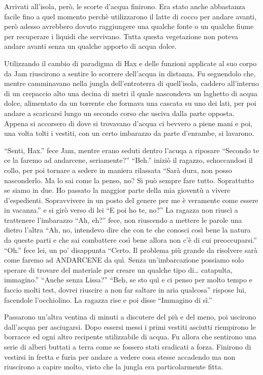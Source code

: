     Arrivati all'isola, però, le scorte d'acqua finirono. Era stato anche
    abbastanza facile fino a quel momento perchè utilizzarono il latte di
    cocco per andare avanti, però adesso avrebbero dovuto raggiungere una
    qualche fonte o un qualche fiume per recuperare i liquidi che
    servivano. Tutta questa vegetazione non poteva andare avanti senza un
    qualche apporto di acqua dolce.
    
    Utilizzando il cambio di paradigma di Hax e delle funzioni applicate al
    suo corpo da Jam riuscirono a sentire lo scorrere dell'acqua in
    distanza. Fu seguendolo che, mentre camminavano nella jungla
    dell'entroterra di quell'isola, caddero all'interno di un crepaccio
    alto una decina di metri il quale nascondeva un laghetto di acqua
    dolce, alimentato da un torrente che formava una cascata su uno dei
    lati, per poi andare a scaricarsi lungo un secondo corso che usciva
    dalla parte opposta. Appena si accorsero di dove si trovavano
    d'acqua ci bevvero a piene mani e poi, una volta tolti i vestiti, con
    un certo imbarazzo da parte d'enrambe, si lavarono.

    ``Senti, Hax.'' fece Jam, mentre erano seduti dentro l'acuqa a
    riposare ``Secondo te ce la faremo ad andarcene, seriamente?'' ``Beh.''
    iniziò il ragazzo, schoccandosi il collo, per poi tornare a sedere in
    maniera rilassata ``Sarà dura, non posso nasconderlo. Ma lo sai come la
    penso, no? Si può sempre fare tutto. Soprattutto se siamo in due. Ho passato la maggior parte della mia gioventù a
    vivere d'espedienti. Sopravvivere in un posto del genere per me è veramente
    come essere in vacanza.'' e si girò verso di lei ``E poi ho te, no?''
    La ragazza non riuscì a trattenere l'imbarazzo ``Ah, eh?'' fece, non
    riuscendo a mettere le parole una dietro l'altra ``Ah, no, intendevo
    dire che con te che conosci così bene la natura da queste parti e che
    sai combattere così bene allora non c'è di cui preoccuparsi.'' ``Oh.''
    fece lei, un po' disappunta ``Certo. Il problema più grande da
    risolvere sarà come faremo ad ANDARCENE da quì. Senza un'imbarcazione
    possiamo solo sperare di trovare del materiale per creare un qualche
    tipo di\dots{} catapulta, immagino.'' ``Anche senza Lissa?'' ``Beh, se
    sto quì e ci penso per molto tempo e faccio molti test, dovrei riuscire
    a non far saltare in aria qualcosa'' rispose lui, facendole
    l'occhiolino. La ragazza rise e poi disse ``Immagino di sì.''

    Passarono un'altra ventina di minuti a discutere del più e del meno,
    poi uscirono dall'acqua per asciugarsi. Dopo essersi messi i primi
    vestiti asciutti riempirono le borracce ed ogni altro recipente
    utilizzabile di acqua. Fu allora che sentirono una serie di alberi buttati a terra
    come se fossero stati sradicati a forza. Finirono di vestirsi in fretta
    e furia per andare a vedere cosa stesse accadendo ma non riuscirono a
    capire molto, visto che la jungla era particolarmente fitta.

